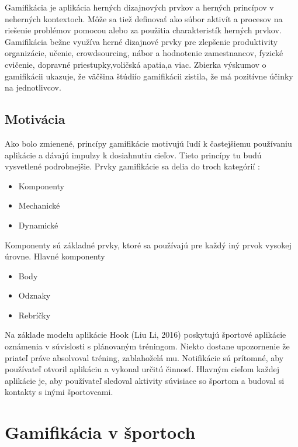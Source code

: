 \documentclass[10pt,twoside,slovak,a4paper]{article}
\begin{document}
\begin{figure*}[tbh]
Gamifikácia je aplikácia herných dizajnových prvkov a herných princípov v neherných kontextoch. Môže sa tiež definovať ako súbor aktivít a procesov na riešenie problémov pomocou alebo za použitia charakteristík herných prvkov. Gamifikácia bežne využíva herné dizajnové
prvky pre zlepšenie produktivity organizácie, učenie, crowdsourcing, nábor a hodnotenie zamestnancov, fyzické cvičenie, dopravné priestupky,voličská apatia,a viac. Zbierka výskumov o gamifikácii ukazuje, že väčšina štúdiío gamifikácii zistila, že má pozitívne účinky na jednotlivcov.


\subsection{Motivácia} 

Ako bolo zmienené, princípy gamifikácie motivujú ľudí k častejšiemu používaniu aplikácie a dávajú impulzy k dosiahnutiu cieľov. Tieto princípy tu budú vysvetlené podrobnejšie. 
\label{prvky} Prvky gamifikácie sa delia do troch kategórií :
\begin{itemize}
  \item {Komponenty}
  \item {Mechanické}
  \item {Dynamické}
\end{itemize}
Komponenty sú základné prvky, ktoré sa používajú pre každý iný prvok vysokej úrovne. Hlavné komponenty
\begin{itemize}
  \item {Body}
  \item {Odznaky}
  \item {Rebríčky}
\end{itemize}
\end{figure*}
\begin{figure*}
    
Na základe modelu aplikácie Hook (Liu Li, 2016) \cite{Improving_motivation-Framework} poskytujú športové aplikácie oznámenia v súvislosti s plánovaným tréningom. Niekto dostane upozornenie že priateľ práve absolvoval tréning, zablahoželá mu. Notifikácie sú prítomné, aby používateľ otvoril aplikáciu a vykonal určitú činnosť. Hlavným cieľom každej aplikácie je, aby používateľ sledoval aktivity súvisiace so športom a budoval si kontakty s inými športovcami.
\end{figure*}
\section{Gamifikácia v športoch} \label{gamifikacia v športoch}
\end{document}
